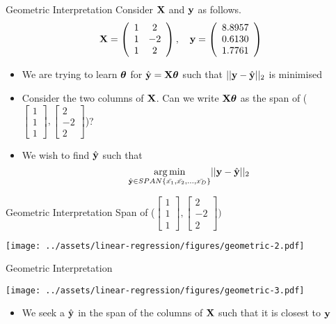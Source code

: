 \documentclass{beamer}
\begin{document}
\begin{frame}{Geometric Interpretation}
Consider $\mathbf{X}$ and $\mathbf{y}$ as follows. 
$$
\mathbf{X}=\left(\begin{array}{cc}
{1} & {2} \\
{1} & {-2} \\
{1} & {2}
\end{array}\right), \quad \mathbf{y}=\left(\begin{array}{c}
{8.8957} \\
{0.6130} \\
{1.7761}
\end{array}\right)
$$
\begin{itemize}[<+->]
\item We are trying to learn $\boldsymbol{\theta}$ for $\hat{\mathbf{y}}=\mathbf{X}\boldsymbol{\theta}$ such that $\vert \vert \mathbf{y} - \hat{\mathbf{y}} \vert \vert_{2}$ is minimised
\item Consider the two columns of $\mathbf{X}$. Can we write $\mathbf{X}\boldsymbol{\theta}$ as the span of ($\begin{bmatrix}
1 \\1\\1
\end{bmatrix}, \begin{bmatrix}
2 \\-2\\2
\end{bmatrix}$)?
\item We wish to find $\hat{\mathbf{y}}$ such that 
$$
\underset{\hat{\mathbf{y}} \in SPAN\{\bar{x_{1}},\bar{x_{2}},\dots,\bar{x_{D}}\} } {\operatorname*{arg\,min}} \vert \vert \mathbf{y} - \hat{\mathbf{y}} \vert \vert_{2}
$$
\end{itemize}

\end{frame}


\begin{frame}{Geometric Interpretation}
Span of ($\begin{bmatrix}
1 \\1\\1
\end{bmatrix}, \begin{bmatrix}
2 \\-2\\2
\end{bmatrix}) $


\texttt{[image: ../assets/linear-regression/figures/geometric-2.pdf]}

\end{frame}


\begin{frame}{Geometric Interpretation}	

    \texttt{[image: ../assets/linear-regression/figures/geometric-3.pdf]}

    


\begin{itemize}[<+->]
\item We seek a $\hat{\mathbf{y}}$ in the span of the columns of $\mathbf{X}$ such that it is closest to $\mathbf{y}$
\end{itemize}

\end{frame}
\end{document}
